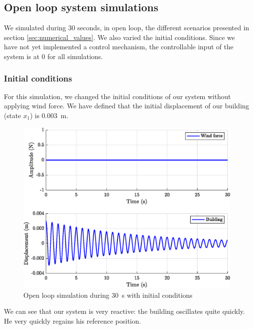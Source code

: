 \subsection{Open loop system simulations}
We simulated during 30 seconds, in open loop, the different scenarios presented in section \ref{sec:numerical_values}. We also varied the initial conditions. Since we have not yet implemented a control mechanism, the controllable input of the system is at 0 for all simulations.

\subsubsection{Initial conditions}
For this simulation, we changed the initial conditions of our system without applying wind force. We have defined that the initial displacement of our building (state $x_1$) is \SI{0.003}{\meter}.
\begin{figure}[H]
    \centering
    \includegraphics[width=\textwidth]{resources/eps/initial-conditions.eps}
    \caption{Open loop simulation during \SI{30}{\second} with initial conditions}
\end{figure}
We can see that our system is very reactive: the building oscillates quite quickly. He very quickly regains his reference position.

